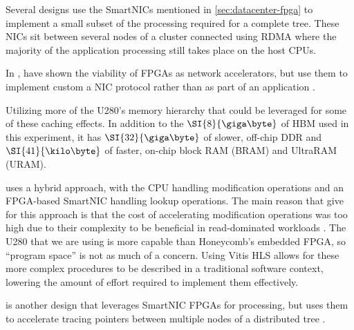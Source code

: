 

Several designs \autocite{honeycomb,strom,star} use the SmartNICs mentioned in
\ref{sec:datacenter-fpga} to implement a small subset of the processing required
for a complete tree. These NICs sit between several nodes of a cluster connected
using RDMA where the majority of the application processing still takes place on
the host CPUs.

In , \citeauthor{star} have shown the viability of FPGAs as
network accelerators, but use them to implement custom a NIC protocol rather
than as part of an application \autocite{star}.

Utilizing more of the U280's memory hierarchy that could be leveraged for some
of these caching effects. In addition to the $\SI{8}{\giga\byte}$ of HBM used in
this experiment, it has $\SI{32}{\giga\byte}$ of slower, off-chip DDR and
$\SI{41}{\kilo\byte}$ of faster, on-chip block RAM (BRAM) and UltraRAM (URAM).

 uses a hybrid approach, with the CPU handling modification
operations and an FPGA-based SmartNIC handling lookup operations. The main
reason that \citeauthor{honeycomb} give for this approach is that the cost of
accelerating modification operations was too high due to their complexity to be
beneficial in read-dominated workloads \autocite{honeycomb}. The U280 that we
are using is more capable than Honeycomb's embedded FPGA, so ``program space''
is not as much of a concern. Using Vitis HLS allows for these more complex
procedures to be described in a traditional software context, lowering the
amount of effort required to implement them effectively.

 is another design that leverages SmartNIC FPGAs for
processing, but uses them to accelerate tracing pointers between multiple nodes
of a distributed tree \autocite{strom}.
